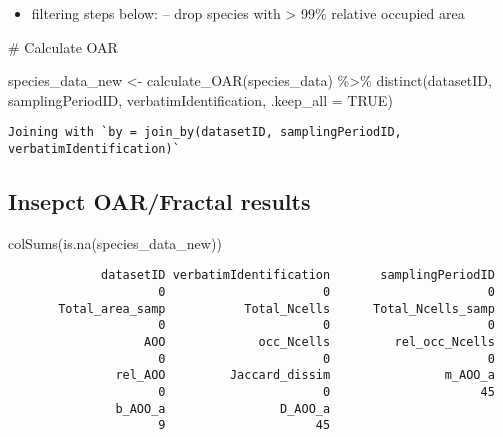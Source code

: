 \documentclass[
  letterpaper,
  DIV=11,
  numbers=noendperiod]{scrreprt}
\newenvironment{Shaded}{\begin{snugshade}}{\end{snugshade}}
\newcommand{\AttributeTok}[1]{\textcolor[rgb]{0.40,0.45,0.13}{#1}}
\newcommand{\CommentTok}[1]{\textcolor[rgb]{0.37,0.37,0.37}{#1}}
\newcommand{\ConstantTok}[1]{\textcolor[rgb]{0.56,0.35,0.01}{#1}}
\newcommand{\FunctionTok}[1]{\textcolor[rgb]{0.28,0.35,0.67}{#1}}
\newcommand{\NormalTok}[1]{\textcolor[rgb]{0.00,0.23,0.31}{#1}}
\newcommand{\OtherTok}[1]{\textcolor[rgb]{0.00,0.23,0.31}{#1}}
\newcommand{\SpecialCharTok}[1]{\textcolor[rgb]{0.37,0.37,0.37}{#1}}
\providecommand{\tightlist}{%
  \setlength{\itemsep}{0pt}\setlength{\parskip}{0pt}}\usepackage{longtable,booktabs,array}
\begin{document}
\begin{itemize}
\tightlist
\item
  filtering steps below: -- drop species with \textgreater{} 99\%
  relative occupied area
\end{itemize}

\begin{Shaded}
\begin{Highlighting}[]
\CommentTok{\# Calculate OAR}

\NormalTok{species\_data\_new }\OtherTok{\textless{}{-}} \FunctionTok{calculate\_OAR}\NormalTok{(species\_data) }\SpecialCharTok{\%\textgreater{}\%}
  \FunctionTok{distinct}\NormalTok{(datasetID, samplingPeriodID, verbatimIdentification, }\AttributeTok{.keep\_all =} \ConstantTok{TRUE}\NormalTok{)}
\end{Highlighting}
\end{Shaded}

\begin{verbatim}
Joining with `by = join_by(datasetID, samplingPeriodID,
verbatimIdentification)`
\end{verbatim}

\hypertarget{insepct-oarfractal-results}{%
\subsection{Insepct OAR/Fractal
results}\label{insepct-oarfractal-results}}

\begin{Shaded}
\begin{Highlighting}[]
\FunctionTok{colSums}\NormalTok{(}\FunctionTok{is.na}\NormalTok{(species\_data\_new))}
\end{Highlighting}
\end{Shaded}

\begin{verbatim}
             datasetID verbatimIdentification       samplingPeriodID
                     0                      0                      0
       Total_area_samp           Total_Ncells      Total_Ncells_samp
                     0                      0                      0
                   AOO             occ_Ncells         rel_occ_Ncells
                     0                      0                      0
               rel_AOO         Jaccard_dissim                m_AOO_a
                     0                      0                     45
               b_AOO_a                D_AOO_a
                     9                     45
\end{verbatim}
\end{document}
